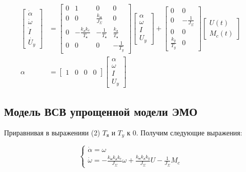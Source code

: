 \documentclass[a4paper, 12pt]{article}
\begin{document}
\begin{align}
    \begin{bmatrix}
        \dot{\alpha} \\
        \dot{\omega} \\
        \dot{I} \\
        \dot{U_y} 
    \end{bmatrix} & = 
    \begin{bmatrix}
        0 & 1 & 0 & 0 \\
        0 & 0 & \frac{k_\text{м}}{J_\Sigma} & 0 \\
        0 & -\frac{k_\text{д}k_e}{T_\text{я}} & - \frac{1}{T_\text{я}} & \frac{k_\text{д}}{T_\text{я}} \\
        0 & 0 & 0 & -\frac{1}{T_y}
    \end{bmatrix}
    \begin{bmatrix}
        \alpha \\
        \omega \\
        I \\
        U_y 
    \end{bmatrix} + 
    \begin{bmatrix}
        0 & 0 \\
        0 & - \frac{1}{J_\Sigma} \\
        0 & 0 \\
        \frac{k_y}{T_y} & 0
    \end{bmatrix}
    \begin{bmatrix}
        U(t) \\
        M_c(t)
    \end{bmatrix} \\
    \alpha & = 
    \begin{bmatrix}
        1 & 0 & 0 & 0
    \end{bmatrix}
    \begin{bmatrix}
        \alpha \\
        \omega \\
        I \\
        U_y 
    \end{bmatrix}
\end{align}

\subsection{Модель ВСВ упрощенной модели ЭМО}
Приравнивая в выраженияи (2) $T_\text{я}$ и $T_y$ к 0. Получим следующие выражения:

\begin{equation}
    \begin{cases}
    \dot{\alpha} = \omega \\
    \dot{\omega} = -\frac{k_\text{м}k_\text{д}k_e}{J_\Sigma}\omega + \frac{k_\text{м}k_\text{д}k_y}{J_\Sigma}U - \frac{1}{J_\Sigma}M_c
    \end{cases}
\end{equation}
\end{document}

